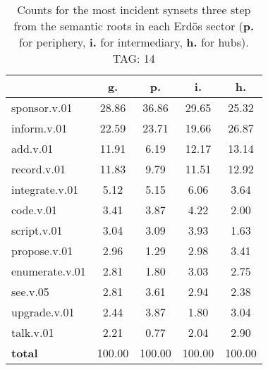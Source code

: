 \begin{table}[h!]
\begin{center}
\begin{tabular}{| l || c | c | c | c |}\hline
 & {\bf g.} & {\bf p.} & {\bf i.} & {\bf h.} \\\hline\hline
sponsor.v.01 & 28.86  & 36.86  & 29.65  & 25.32 \\\hline
inform.v.01 & 22.59  & 23.71  & 19.66  & 26.87 \\\hline
add.v.01 & 11.91  & 6.19  & 12.17  & 13.14 \\\hline
record.v.01 & 11.83  & 9.79  & 11.51  & 12.92 \\\hline
integrate.v.01 & 5.12  & 5.15  & 6.06  & 3.64 \\\hline
code.v.01 & 3.41  & 3.87  & 4.22  & 2.00 \\\hline
script.v.01 & 3.04  & 3.09  & 3.93  & 1.63 \\\hline
propose.v.01 & 2.96  & 1.29  & 2.98  & 3.41 \\\hline
enumerate.v.01 & 2.81  & 1.80  & 3.03  & 2.75 \\\hline
see.v.05 & 2.81  & 3.61  & 2.94  & 2.38 \\\hline
upgrade.v.01 & 2.44  & 3.87  & 1.80  & 3.04 \\\hline
talk.v.01 & 2.21  & 0.77  & 2.04  & 2.90 \\\hline\hline
{{\bf total}} & 100.00  & 100.00  & 100.00  & 100.00 \\\hline
\end{tabular}
\caption{Counts for the most incident synsets three step from the semantic roots in each Erd\"os sector ({\bf p.} for periphery, {\bf i.} for intermediary, {\bf h.} for hubs). TAG: 14}
\end{center}
\end{table}